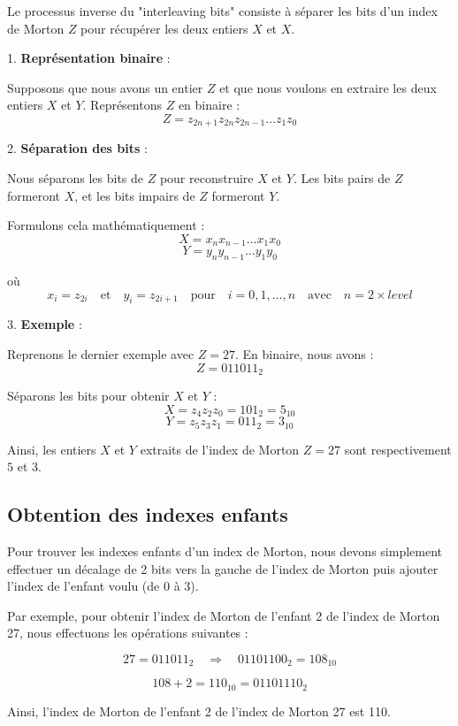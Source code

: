 Le processus inverse du "interleaving bits" consiste à séparer les bits d'un index de Morton \( Z \) pour récupérer les deux entiers \( X \) et \( X \).

1. \textbf{Représentation binaire} :

   Supposons que nous avons un entier \( Z \) et que nous voulons en extraire les deux entiers \( X \) et \( Y \). Représentons \( Z \) en binaire :
   \[
   Z = z_{2n+1} z_{2n} z_{2n-1} \ldots z_1 z_0
   \]

2. \textbf{Séparation des bits} :

   Nous séparons les bits de \( Z \) pour reconstruire \( X \) et \( Y \). Les bits pairs de \( Z \) formeront \( X \), et les bits impairs de \( Z \) formeront \( Y \).

   Formulons cela mathématiquement :
   \[
   X = x_n x_{n-1} \ldots x_1 x_0
   \]
   \[
   Y = y_n y_{n-1} \ldots y_1 y_0
   \]

   où
   \[
   x_i = z_{2i} \quad \text{et} \quad y_i = z_{2i+1} \quad \text{pour} \quad i = 0, 1, \ldots, n \quad \text{avec} \quad n = 2 \times {level}
   \]

3. \textbf{Exemple} :

   Reprenons le dernier exemple avec \( Z = 27 \). En binaire, nous avons :
   \[
   Z = 011011_2
   \]

   Séparons les bits pour obtenir \( X \) et \( Y \) :
   \[
   X = z_{4}z_{2}z_{0} = 101_2 = 5_{10}
   \]
   \[
   Y = z_{5}z_{3}z_{1} = 011_2 = 3_{10}
   \]

Ainsi, les entiers \( X \) et \( Y \) extraits de l'index de Morton \( Z = 27 \) sont respectivement \( 5 \) et \( 3 \).

\subsection*{Obtention des indexes enfants}

Pour trouver les indexes enfants d'un index de Morton, nous devons simplement effectuer un décalage de 2 bits vers la gauche de l'index de Morton puis ajouter l'index de l'enfant voulu (de 0 à 3).

Par exemple, pour obtenir l'index de Morton de l'enfant 2 de l'index de Morton 27, nous effectuons les opérations suivantes :

\[
27 = 011011_2 \quad \Rightarrow \quad 01101100_2 = 108_{10}
\]

\[
108 + 2 = 110_{10} = 01101110_2
\]

Ainsi, l'index de Morton de l'enfant 2 de l'index de Morton 27 est 110.